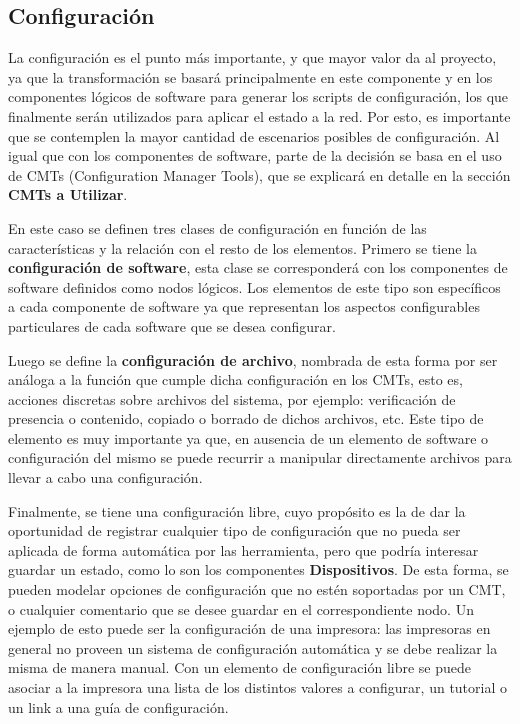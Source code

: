 \subsection{Configuración}
La configuración es el punto más importante, y que mayor valor da al proyecto, ya que la transformación se basará principalmente en este componente y en los componentes lógicos de software para generar los scripts de configuración, los que finalmente serán utilizados para aplicar el estado a la red.
Por esto, es importante que se contemplen la mayor cantidad de escenarios posibles de configuración.
Al igual que con los componentes de software, parte de la decisión se basa en el uso de CMTs (Configuration Manager Tools), que se explicará en detalle en la sección \textbf{CMTs a Utilizar}.

En este caso se definen tres clases de configuración en función de las características y la relación con el resto de los elementos.
Primero se tiene la \textbf{configuración de software}, esta clase se corresponderá con los componentes de software definidos como nodos lógicos. Los elementos de este tipo son específicos a cada componente de software ya que representan los aspectos configurables particulares de cada software que se desea configurar.

Luego se define la \textbf{configuración de archivo}, nombrada de esta forma por ser análoga a la función que cumple dicha configuración en los CMTs, esto es, acciones discretas sobre archivos del sistema, por ejemplo: verificación de presencia o contenido, copiado o borrado de dichos archivos, etc. Este tipo de elemento es muy importante ya que, en ausencia de un elemento de software o configuración del mismo se puede recurrir a manipular directamente archivos para llevar a cabo una configuración.

Finalmente, se tiene una configuración libre, cuyo propósito es la de dar la oportunidad de registrar cualquier tipo de configuración que no pueda ser aplicada de forma automática por las herramienta, pero que podría interesar guardar un estado, como lo son los componentes \textbf{Dispositivos}. De esta forma, se pueden modelar opciones de configuración que no estén soportadas por un CMT, o cualquier comentario que se desee guardar en el correspondiente nodo. 
Un ejemplo de esto puede ser la configuración de una impresora: las impresoras en general no proveen un sistema de configuración automática y se debe realizar la misma de manera manual. Con un elemento de configuración libre se puede asociar a la impresora una lista de los distintos valores a configurar, un tutorial o un link a una guía de configuración.


